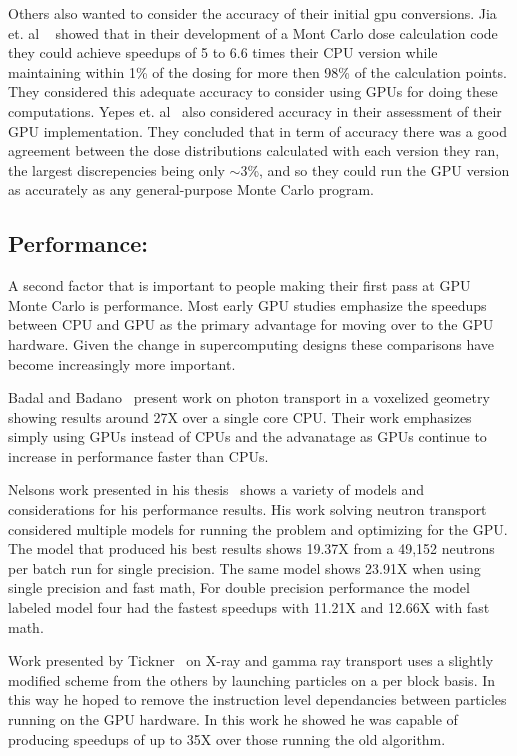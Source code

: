 Others also wanted to consider the accuracy of their initial gpu conversions.
%
Jia et. al ~\cite{jia2010development} showed that in their development of a Mont Carlo dose calculation code they could achieve speedups of 5 to 6.6 times their CPU version while maintaining within 1\% of the dosing for more then 98\% of the calculation points.
%
They considered this adequate accuracy to consider using GPUs for doing these computations.
%
Yepes et. al~\cite{yepes2010gpu} also considered accuracy in their assessment of their GPU implementation.
%
They concluded that in term of accuracy there was a good agreement between the dose distributions calculated with each version they ran, the largest discrepencies being only $\sim$3\%, and so they could run the GPU version as accurately as any general-purpose Monte Carlo program.
%

\subsection*{Performance:}

A second factor that is important to people making their first pass at GPU Monte Carlo is performance.
%
Most early GPU studies emphasize the speedups between CPU and GPU as the primary advantage for moving over to the GPU hardware.
%
Given the change in supercomputing designs these comparisons have become increasingly more important.
%

Badal and Badano~\cite{badal2009accelerating} present work on photon transport in a voxelized geometry showing results around 27X over a single core CPU.
%
Their work emphasizes simply using GPUs instead of CPUs and the advanatage as GPUs continue to increase in performance faster than CPUs.
%

Nelsons work presented in his thesis~\cite{nelson2009monte} shows a variety of models and considerations for his performance results.
%
His work solving neutron transport considered multiple models for running the problem and optimizing for the GPU.
%
The model that produced his best results shows 19.37X from a 49,152 neutrons per batch run for single precision.
%
The same model shows 23.91X when using single precision and fast math,
%
For double precision performance the model labeled model four had the fastest speedups with 11.21X and 12.66X with fast math.

Work presented by Tickner~\cite{tickner2010monte} on X-ray and gamma ray transport uses a slightly modified scheme from the others by launching particles on a per block basis.
%
In this way he hoped to remove the instruction level dependancies between particles running on the GPU hardware.
%
In this work he showed he was capable of producing speedups of up to 35X over those running the old algorithm.

